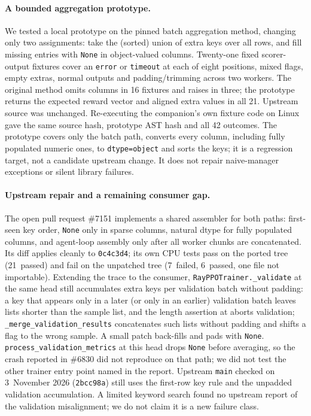 \documentclass[10pt,a4paper]{article}
\let\cite\citep
\begin{document}
\paragraph{A bounded aggregation prototype.}
We tested a local prototype on the pinned batch aggregation method, changing
only two assignments: take the (sorted) union of extra keys over all rows, and
fill missing entries with \texttt{None} in object-valued columns. Twenty-one
fixed scorer-output fixtures cover an \texttt{error} or \texttt{timeout}
at each of eight positions, mixed flags, empty extras, normal outputs and
padding/trimming across two workers. The original method omits columns in
16 fixtures and raises in three; the prototype returns the expected reward
vector and aligned extra values in all 21. Upstream source was unchanged.
Re-executing the companion's own fixture code on Linux gave the
same source hash, prototype AST hash and all 42 outcomes. The prototype covers
only the batch path, converts every column, including fully populated
numeric ones, to \texttt{dtype=object} and sorts the keys; it is a
regression target, not a candidate upstream change. It does not repair
naive-manager exceptions or silent library failures.

\paragraph{Upstream repair and a remaining consumer gap.}
The open pull request \#7151 \cite{verl7151} implements a shared assembler
for both paths: first-seen key order, \texttt{None} only in sparse columns,
natural dtype for fully populated columns, and agent-loop assembly only after
all worker chunks are concatenated. Its diff applies cleanly to
\texttt{0c4c3d4}; its own CPU tests pass on the ported tree (21~passed) and
fail on the unpatched tree (7~failed, 6~passed, one file not importable).
Extending the trace to the consumer, \texttt{RayPPOTrainer.\_validate} at the
same head still accumulates extra keys per validation batch without padding:
a key that appears only in a later (or only in an earlier) validation batch
leaves lists shorter than the sample list, and the length assertion at
 aborts validation;
\texttt{\_merge\_validation\_results} concatenates such lists without padding
and shifts a flag to the wrong sample. A small patch back-fills and pads with
\texttt{None}. \texttt{process\_validation\_metrics} at this head drops
\texttt{None} before averaging, so the crash reported in \#6830
\cite{verl6830} did not reproduce on that path; we did not test the other
trainer entry point named in the report. Upstream \texttt{main} checked on
3~November 2026 (\texttt{2bcc98a}) still uses the first-row key rule and the
unpadded validation accumulation. A limited keyword search found no upstream
report of the validation misalignment; we do not claim it is a new failure
class.
\end{document}
